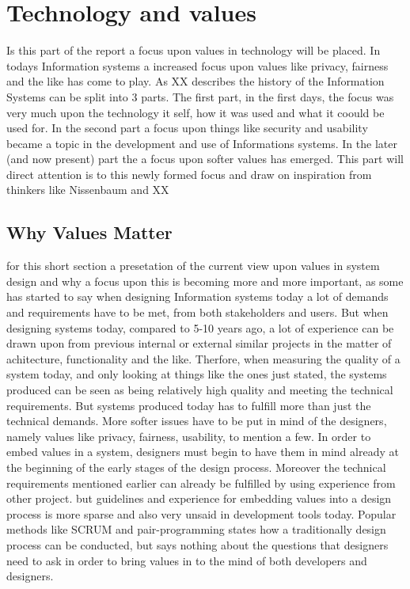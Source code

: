 
\section{Technology and values}
Is this part of the report a focus upon values in technology will be placed. In todays Information systems a increased focus upon values like privacy, fairness and the like has come to play. As XX describes the history of the Information Systems can be split into 3 parts. The first part, in the first days, the focus was very much upon the technology it self, how it was used and what it coould be used for. In the second part a focus upon things like security and usability became a topic in the development and use of Informations systems. In the later (and now present) part the a focus upon softer values has emerged. This part will direct attention is to this newly formed focus and draw on inspiration from thinkers like Nissenbaum and XX 

\subsection{Why Values Matter}
for this short section a presetation of the current view upon values in system design and why a focus upon this is becoming more and more important, as some has started to say
when designing Information systems today a lot of demands and requirements have to be met, from both stakeholders and users. But when designing systems today, compared to 5-10 years ago, a lot of experience can be drawn upon from previous internal or external similar projects in the matter of achitecture, functionality and the like. Therfore, when measuring the quality of a system today, and only looking at things like the ones just stated, the systems produced can be seen as being relatively high quality and meeting the technical requirements. But systems produced today has to fulfill more than just the technical demands. More softer issues have to be put in mind of the designers, namely values like privacy, fairness, usability, to mention a few. In order to embed values in a system, designers must begin to have them in mind already at the beginning of the early stages of the design process. Moreover the technical requirements mentioned earlier can already be fulfilled by using experience from other project. but guidelines and experience for embedding values into a design process is more sparse and also very unsaid in development tools today. Popular methods like SCRUM and pair-programming states how a traditionally design process can be conducted, but says nothing about the questions that designers need to ask in order to bring values in to the mind of both developers and designers. 